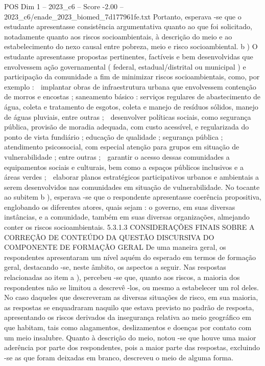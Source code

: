 \begin{textsample}{POS Dim 1 – 2023\_c6 – Score -2.00 – 2023\_c6/enade\_2023\_biomed\_7d177961fe.txt}
Portanto, esperava -se que o estudante apresentasse consistência argumentativa quanto ao que foi solicitado, notadamente quanto aos riscos socioambientais, à descrição do meio e ao estabelecimento do nexo causal entre pobreza, meio e risco socioambiental. b ) O estudante apresentasse propostas pertinentes, factíveis e bem desenvolvidas que envolvessem ação governamental ( federal, estadual/distrital ou municipal ) e participação da comunidade a fim de minimizar riscos socioambientais, como, por exemplo :  implantar obras de infraestrutura urbana que envolvessem contenção de morros e encostas ; saneamento básico : serviços regulares de abastecimento de água, coleta e tratamento de esgotos, coleta e manejo de resíduos sólidos, manejo de águas pluviais, entre outras ;  desenvolver políticas sociais, como segurança pública, provisão de moradia adequada, com custo acessível, e regularizada do ponto de vista fundiário ; educação de qualidade ; segurança pública ; atendimento psicossocial, com especial atenção para grupos em situação de vulnerabilidade ; entre outras ;  garantir o acesso dessas comunidades a equipamentos sociais e culturais, bem como a espaços públicos inclusivos e a áreas verdes ;  elaborar planos estratégicos participativos urbanos e ambientais a serem desenvolvidos nas comunidades em situação de vulnerabilidade.
No tocante ao subitem b ), esperava -se que o respondente apresentasse coerência propositiva, englobando os diferentes atores, quais sejam : o governo, em suas diversas instâncias, e a comunidade, também em suas diversas organizações, almejando conter os riscos socioambientais. 5.3.1.3 CONSIDERAÇÕES FINAIS SOBRE A CORREÇÃO DE CONTEÚDO DA QUESTÃO DISCURSIVA DO COMPONENTE DE FORMAÇÃO GERAL De uma maneira geral, os respondentes apresentaram um nível aquém do esperado em termos de formação geral, destacando -se, neste âmbito, os aspectos a seguir.
Nas respostas relacionadas ao item a ), percebeu -se que, quanto aos riscos, a maioria dos respondentes não se limitou a descrevê -los, ou mesmo a estabelecer um rol deles.
No caso daqueles que descreveram as diversas situações de risco, em sua maioria, as respostas se enquadraram naquilo que estava previsto no padrão de resposta, apresentando os riscos derivados da insegurança relativa ao meio geográfico em que habitam, tais como alagamentos, deslizamentos e doenças por contato com um meio insalubre.
Quanto à descrição do meio, notou -se que houve uma maior aderência por parte dos respondentes, pois a maior parte das respostas, excluindo -se as que foram deixadas em branco, descreveu o meio de alguma forma.

\end{textsample}
